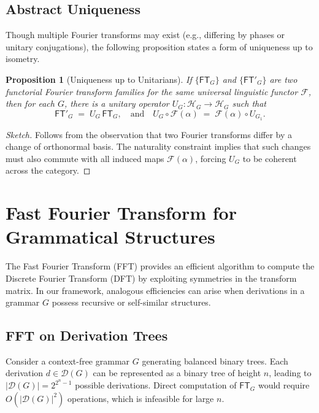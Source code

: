 \documentclass[11pt]{article}
\newtheorem{proposition}{Proposition}[section]
\begin{document}
\subsection{Abstract Uniqueness}

Though multiple Fourier transforms may exist (e.g., differing by phases or unitary conjugations), the following proposition states a form of uniqueness up to isometry.

\begin{proposition}[Uniqueness up to Unitarians]
If \(\{\mathsf{FT}_G\}\) and \(\{\mathsf{FT}'_G\}\) are two functorial Fourier transform families for the same universal linguistic functor \(\mathcal{F}\), then for each \(G\), there is a unitary operator \(U_G : \mathcal{H}_G \to \mathcal{H}_G\) such that
\[
 \mathsf{FT}'_G \;=\; U_G \,\mathsf{FT}_G,
 \quad
 \text{and}
 \quad
 U_G \circ \mathcal{F}(\alpha) \;=\; \mathcal{F}(\alpha) \circ U_{G_1}.
\]
\end{proposition}

\begin{proof}[Sketch]
Follows from the observation that two Fourier transforms differ by a change of orthonormal basis. The naturality constraint implies that such changes must also commute with all induced maps \(\mathcal{F}(\alpha)\), forcing $U_G$ to be coherent across the category.
\end{proof}

\section{Fast Fourier Transform for Grammatical Structures}
\label{sec:fft}

The Fast Fourier Transform (FFT) provides an efficient algorithm to compute the Discrete Fourier Transform (DFT) by exploiting symmetries in the transform matrix. In our framework, analogous efficiencies can arise when derivations in a grammar \( G \) possess recursive or self-similar structures.

\subsection{FFT on Derivation Trees}
Consider a context-free grammar \( G \) generating balanced binary trees. Each derivation \( d \in \mathcal{D}(G) \) can be represented as a binary tree of height \( n \), leading to \( |\mathcal{D}(G)| = 2^{2^n - 1} \) possible derivations. Direct computation of \( \mathsf{FT}_G \) would require \( O(|\mathcal{D}(G)|^2) \) operations, which is infeasible for large \( n \).
\end{document}
